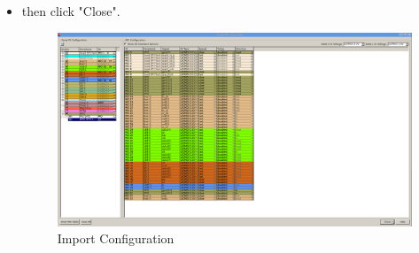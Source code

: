 \documentclass{article}
\begin{document}
\begin{enumerate}
\begin{itemize}
		\item then click "Close".
	\begin{figure}
	\includegraphics[scale=0.25]{pictures/MIOConfig2.png}
	\caption{Import Configuration}
	\end{figure}
	\end{itemize}


\end{enumerate}
\end{document}
